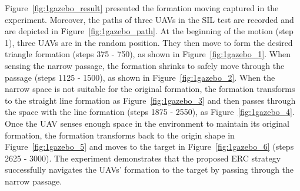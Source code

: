 Figure~\ref{fig:1gazebo_result} presented the formation moving captured in the experiment. Moreover, the paths of three UAVs in the SIL test are recorded and are depicted in Figure~\ref{fig:1gazebo_path}. At the beginning of the motion (step 1), three UAVs are in the random position. They then move to form the desired triangle formation (steps 375 - 750), as shown in Figure~\ref{fig:1gazebo_1}. When sensing the narrow passage, the formation shrinks to safely move through the passage (steps 1125 - 1500), as shown in Figure~\ref{fig:1gazebo_2}. When the narrow space is not suitable for the original formation, the formation transforms to the straight line formation as Figure~\ref{fig:1gazebo_3} and then passes through the space with the line formation (steps 1875 - 2550), as Figure~\ref{fig:1gazebo_4}. Once the UAV senses enough space in the environment to maintain its original formation, the formation transforms back to the origin shape in Figure~\ref{fig:1gazebo_5} and moves to the target in Figure~\ref{fig:1gazebo_6} (steps 2625 - 3000). The experiment demonstrates that the proposed ERC strategy successfully navigates the UAVs' formation to the target by passing through the narrow passage.





